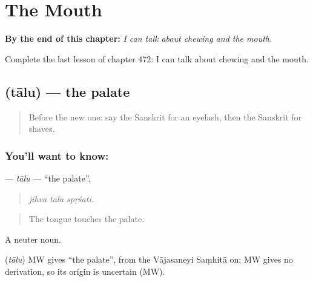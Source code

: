 
\chapter{The Mouth}
\label{ch:sa-the-mouth}

\begin{chapteropening}
\textbf{By the end of this chapter:} \emph{I can talk about chewing and the mouth.}

Complete the last lesson of chapter 472: I can talk about chewing and the mouth.
\end{chapteropening}

\section[\texorpdfstring{\sk{तालु} (tālu)}{तालु (tālu)}]{ (tālu) — the palate}

\label{lesson:SA-C472-talu}



\begin{quote}
Before the new one: say the Sanskrit for an eyelash, then the Sanskrit for shaves.
\end{quote}

\subsection*{You'll want to know: }
\textbf{} — \emph{tālu} — \textquotedblleft{}the palate\textquotedblright{}.

\begin{quote}
  
\end{quote}

\begin{quote}
\emph{jihvā tālu spṛśati.}
\end{quote}

\begin{quote}
The tongue touches the palate.
\end{quote}

A neuter noun.

\begin{cousinweb}
\textbf{} (\emph{tālu}) MW gives \textquotedblleft{}the palate\textquotedblright{}, from the Vājasaneyi Saṃhitā on; MW gives no derivation, so its origin is uncertain (MW).
\end{cousinweb}

